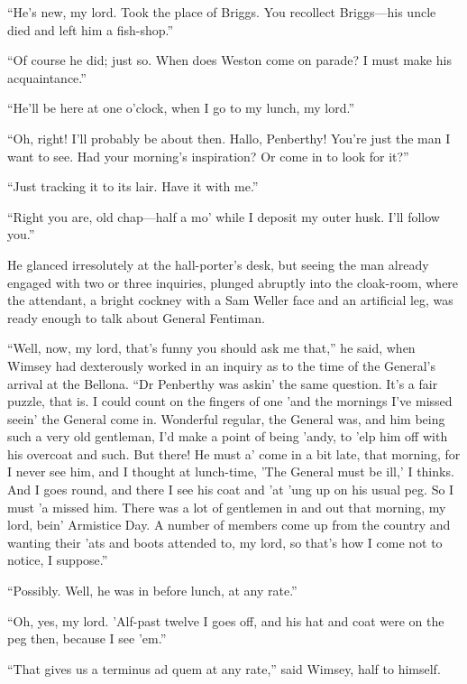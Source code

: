 \enquote{He's new, my lord. Took the place of Briggs. You recollect Briggs\allowbreak---\allowbreak his uncle died and left him a fish-shop.}

\enquote{Of course he did; just so. When does Weston come on parade? I must make his acquaintance.}

\enquote{He'll be here at one o'clock, when I go to my lunch, my lord.}

\enquote{Oh, right! I'll probably be about then. Hallo, Penberthy! You're just the man I want to see. Had your morning's inspiration? Or come in to look for it?}

\enquote{Just tracking it to its lair. Have it with me.}

\enquote{Right you are, old chap\allowbreak---\allowbreak half a mo' while I deposit my outer husk. I'll follow you.}

He glanced irresolutely at the hall-porter's desk, but seeing the man already engaged with two or three inquiries, plunged abruptly into the cloak-room, where the attendant, a bright cockney with a Sam Weller face and an artificial leg, was ready enough to talk about General Fentiman.

\enquote{Well, now, my lord, that's funny you should ask me that,} he said, when Wimsey had dexterously worked in an inquiry as to the time of the General's arrival at the Bellona. \enquote{Dr Penberthy was askin' the same question. It's a fair puzzle, that is. I could count on the fingers of one 'and the mornings I've missed seein' the General come in. Wonderful regular, the General was, and him being such a very old gentleman, I'd make a point of being 'andy, to 'elp him off with his overcoat and such. But there! He must a' come in a bit late, that morning, for I never see him, and I thought at lunch-time, 'The General must be ill,' I thinks. And I goes round, and there I see his coat and 'at 'ung up on his usual peg. So I must 'a missed him. There was a lot of gentlemen in and out that morning, my lord, bein' Armistice Day. A number of members come up from the country and wanting their 'ats and boots attended to, my lord, so that's how I come not to notice, I suppose.}

\enquote{Possibly. Well, he was in before lunch, at any rate.}

\enquote{Oh, yes, my lord. 'Alf-past twelve I goes off, and his hat and coat were on the peg then, because I see 'em.}

\enquote{That gives us a terminus ad quem at any rate,} said Wimsey, half to himself.

